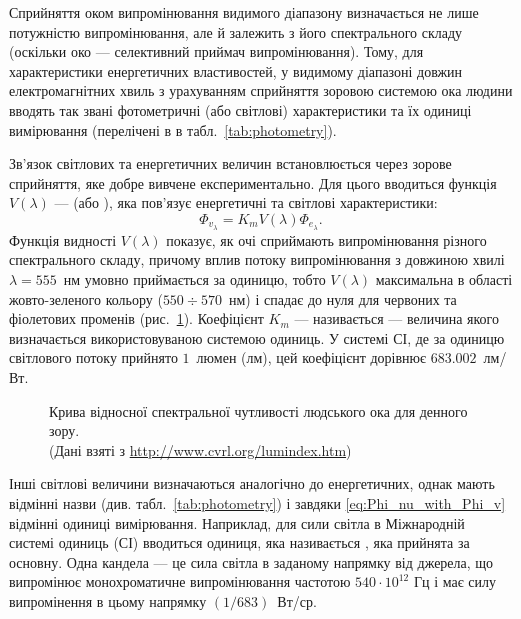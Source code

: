 Сприйняття оком випромінювання видимого діапазону визначається не лише потужністю випромінювання, але й залежить з його спектрального складу (оскільки око --- селективний приймач випромінювання). Тому, для характеристики енергетичних властивостей, у видимому діапазоні довжин електромагнітних хвиль з урахуванням сприйняття зоровою системою ока людини  вводять так звані фотометричні (або світлові) характеристики та їх одиниці вимірювання (перелічені в в табл.~\ref{tab:photometry}).

Зв'язок світлових та енергетичних величин встановлюється через зорове сприйняття, яке добре вивчене експериментально.  Для цього вводиться функція $ V(\lambda) $ ---  (або ), яка пов'язує енергетичні та світлові характеристики:
\begin{equation}\label{eq:Phi_nu_with_Phi_v}
	\Phi_{v_{\lambda}} = K_m V(\lambda) \Phi_{e_{\lambda}}.
\end{equation}
Функція видності $V(\lambda)$ показує, як очі сприймають випромінювання різного спектрального складу, причому вплив потоку випромінювання з довжиною хвилі $\lambda = 555$~нм умовно приймається за одиницю, тобто $V(\lambda)$ максимальна в області жовто-зеленого кольору ($550 \div 570$~нм) і спадає до нуля для червоних та фіолетових променів (рис.~\ref{plt:LF}). Коефіцієнт $K_{m}$ --- називається  --- величина якого визначається використовуваною системою одиниць. У системі СІ, де за одиницю світлового потоку прийнято $1$~люмен (лм), цей коефіцієнт дорівнює $683.002$~лм/Вт.

\begin{figure}[h!]\centering
	
	\caption{Крива відносної спектральної чутливості людського ока для денного зору.
        \\ (Дані взяті з \url{http://www.cvrl.org/lumindex.htm})
    }
	\label{plt:LF}
\end{figure}

Інші світлові величини визначаються аналогічно до енергетичних, однак мають відмінні назви (див. табл.~\ref{tab:photometry}) і завдяки \eqref{eq:Phi_nu_with_Phi_v} відмінні одиниці вимірювання. Наприклад, для сили світла в Міжнародній системі одиниць (СІ) вводиться одиниця, яка називається , яка прийнята за основну. Одна кандела --- це сила світла в заданому напрямку від джерела, що випромінює монохроматичне випромінювання частотою $540\cdot10^{12}$ Гц і має силу випромінення в цьому напрямку $(1/683)$~Вт/ср.

